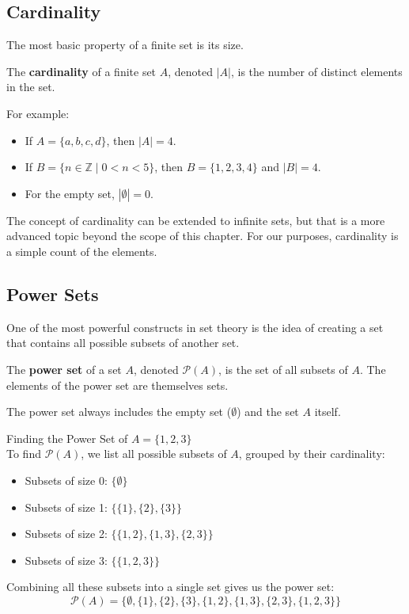 \subsection*{Cardinality}
The most basic property of a finite set is its size.

\begin{definition}[Cardinality]
    The \textbf{cardinality} of a finite set $A$, denoted $|A|$, is the number of distinct elements in the set.
\end{definition}

For example:
\begin{itemize}
    \item If $A = \{a, b, c, d\}$, then $|A| = 4$.
    \item If $B = \{ n \in \mathbb{Z} \mid 0 < n < 5 \}$, then $B = \{1, 2, 3, 4\}$ and $|B| = 4$.
    \item For the empty set, $|\emptyset| = 0$.
\end{itemize}

The concept of cardinality can be extended to infinite sets, but that is a more advanced topic beyond the scope of this chapter. For our purposes, cardinality is a simple count of the elements.

\subsection*{Power Sets}
One of the most powerful constructs in set theory is the idea of creating a set that contains all possible subsets of another set.

\begin{definition}
    The \textbf{power set} of a set $A$, denoted $\mathcal{P}(A)$, is the set of all subsets of $A$. The elements of the power set are themselves sets.
\end{definition}

The power set always includes the empty set ($\emptyset$) and the set $A$ itself.

\begin{example}{Finding the Power Set of $A = \{1, 2, 3\}$}\\
    To find $\mathcal{P}(A)$, we list all possible subsets of $A$, grouped by their cardinality:
    \begin{itemize}
        \item Subsets of size 0: $\{ \emptyset \}$
        \item Subsets of size 1: $\{ \{1\}, \{2\}, \{3\} \}$
        \item Subsets of size 2: $\{ \{1, 2\}, \{1, 3\}, \{2, 3\} \}$
        \item Subsets of size 3: $\{ \{1, 2, 3\} \}$
    \end{itemize}
    
    Combining all these subsets into a single set gives us the power set:
    \[ \mathcal{P}(A) = \{ \emptyset, \{1\}, \{2\}, \{3\}, \{1, 2\}, \{1, 3\}, \{2, 3\}, \{1, 2, 3\} \} \]
\end{example}

